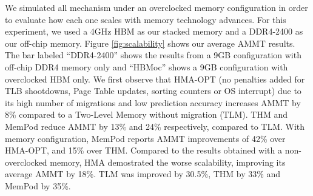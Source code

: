 We simulated all mechanism under an overclocked memory configuration in order to evaluate how each one scales with memory technology advances. For this experiment, we used a 4GHz HBM as our stacked memory and a DDR4-2400 as our off-chip memory. Figure \ref{fig:scalability} shows our average AMMT results. The bar labeled ``DDR4-2400'' shows the results from a 9GB configuration with off-chip DDR4 memory only and ``HBMoc'' shows a 9GB configuration with overclocked HBM only. We first observe that HMA-OPT (no penalties added for TLB shootdowns, Page Table updates, sorting counters or OS interrupt) due to its high number of migrations and low prediction accuracy increases AMMT by 8\% compared to a Two-Level Memory without migration (TLM). THM and MemPod reduce AMMT by 13\% and 24\% respectively, compared to TLM. With memory configuration, MemPod reports AMMT improvements of 42\% over HMA-OPT, and 15\% over THM. Compared to the results obtained with a non-overclocked memory, HMA demostrated the worse scalability, improving its average AMMT by 18\%. TLM was improved by 30.5\%, THM by 33\% and MemPod by 35\%.